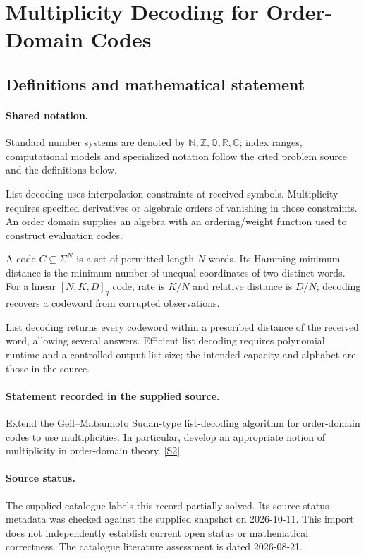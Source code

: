 \documentclass[11pt]{article}
\newcommand{\sref}[2]{\hyperlink{source:#1:#2}{[S#2]}}
\begin{document}
\section{Multiplicity Decoding for Order-Domain Codes}\label{statement}

\subsection{Definitions and mathematical statement}

\paragraph{Shared notation.}Standard number systems are denoted by $\mathbb N,\mathbb Z,\mathbb Q,\mathbb R,\mathbb C$; index ranges, computational models and specialized notation follow the cited problem source and the definitions below.


List decoding uses interpolation constraints at received symbols. Multiplicity requires specified derivatives or algebraic orders of vanishing in those constraints. An order domain supplies an algebra with an ordering/weight function used to construct evaluation codes.

A code $C\subseteq\Sigma^N$ is a set of permitted length-$N$ words. Its Hamming minimum distance is the minimum number of unequal coordinates of two distinct words. For a linear $[N,K,D]_q$ code, rate is $K/N$ and relative distance is $D/N$; decoding recovers a codeword from corrupted observations.

List decoding returns every codeword within a prescribed distance of the received word, allowing several answers. Efficient list decoding requires polynomial runtime and a controlled output-list size; the intended capacity and alphabet are those in the source.
\paragraph{Statement recorded in the supplied source.}
Extend the Geil–Matsumoto Sudan-type list-decoding algorithm for order-domain codes to use multiplicities. In particular, develop an appropriate notion of multiplicity in order-domain theory. \sref{statement}{2}
\paragraph{Source status.}
The supplied catalogue labels this record partially solved. Its source-status metadata was checked against the supplied snapshot on 2026-10-11. This import does not independently establish current open status or mathematical correctness. The catalogue literature assessment is dated 2026-08-21.
\end{document}
